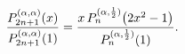 \[\frac{\mathop{P^{(\alpha,\alpha)}_{2n+1}\/}\nolimits\!\left(x\right)}{\mathop{%
P^{(\alpha,\alpha)}_{2n+1}\/}\nolimits\!\left(1\right)}=\frac{x\mathop{P^{(%
\alpha,\frac{1}{2})}_{n}\/}\nolimits\!\left(2x^{2}-1\right)}{\mathop{P^{(%
\alpha,\frac{1}{2})}_{n}\/}\nolimits\!\left(1\right)}.\]